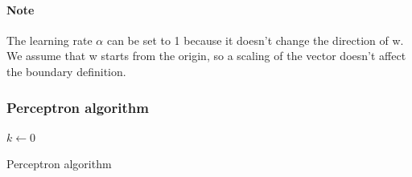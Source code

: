\documentclass[main.tex]{subfiles}
\begin{document}
\paragraph{Note} The learning rate $\alpha$ can be set to 1 because it doesn't change the direction of w. We assume that w starts from the origin, so a scaling of the vector doesn't affect the boundary definition.

\subsubsection{Perceptron algorithm}
\begin{algorithm}[H]
\SetAlgoLined
{}
$k \leftarrow 0$\;
\caption{Perceptron algorithm}
\end{algorithm}
\end{document}
